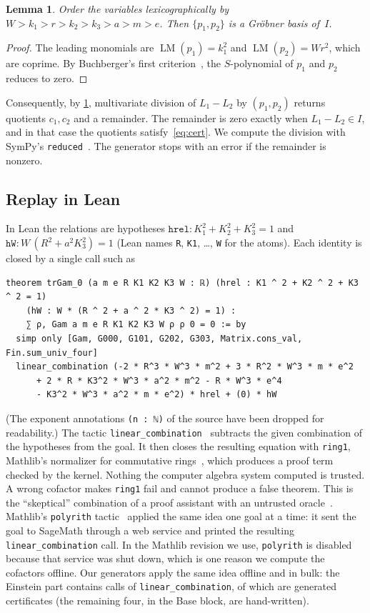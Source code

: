 \documentclass[11pt]{article}
\newtheorem{lemma}[theorem]{Lemma}
\theoremstyle{definition}
\theoremstyle{remark}
\newcommand{\lean}[1]{\lstinline[basicstyle=\ttfamily\normalsize,columns=fullflexible,breaklines=false]{#1}}
\newcommand{\LM}{\operatorname{LM}}
\begin{document}
\begin{lemma}\label{lem:gb}
Order the variables lexicographically by $W>k_1>r>k_2>k_3>a>m>e$.
Then $\{p_1,p_2\}$ is a Gr\"obner basis of~$I$.
\end{lemma}
\begin{proof}
The leading monomials are $\LM(p_1)=k_1^2$ and $\LM(p_2)=Wr^2$, which are coprime.
By Buchberger's first criterion~\cite{buchberger1965,buchberger1979,cox2015}, the $S$-polynomial of $p_1$ and $p_2$ reduces to zero.
\end{proof}

Consequently, by \cref{lem:gb}, multivariate division of $L_1-L_2$ by $(p_1,p_2)$ returns quotients $c_1,c_2$ and a remainder.
The remainder is zero exactly when $L_1-L_2\in I$, and in that case the quotients satisfy~\eqref{eq:cert}.
We compute the division with SymPy's \texttt{reduced}~\cite{meurer2017}.
The generator stops with an error if the remainder is nonzero.

\subsection{Replay in Lean}

In Lean the relations are hypotheses
$\mathtt{hrel}:K_1^2+K_2^2+K_3^2=1$ and $\mathtt{hW}:W\,(R^2+a^2K_3^2)=1$ (Lean names \lean{R}, \lean{K1}, \ldots, \lean{W} for the atoms).
Each identity is closed by a single call such as
\begin{lstlisting}
theorem trGam_0 (a m e R K1 K2 K3 W : ℝ) (hrel : K1 ^ 2 + K2 ^ 2 + K3 ^ 2 = 1)
    (hW : W * (R ^ 2 + a ^ 2 * K3 ^ 2) = 1) :
    ∑ ρ, Gam a m e R K1 K2 K3 W ρ ρ 0 = 0 := by
  simp only [Gam, G000, G101, G202, G303, Matrix.cons_val, Fin.sum_univ_four]
  linear_combination (-2 * R^3 * W^3 * m^2 + 3 * R^2 * W^3 * m * e^2
      + 2 * R * K3^2 * W^3 * a^2 * m^2 - R * W^3 * e^4
      - K3^2 * W^3 * a^2 * m * e^2) * hrel + (0) * hW
\end{lstlisting}
(The exponent annotations \lean{(n : ℕ)} of the source have been dropped for readability.)
The tactic \lean{linear_combination}~\cite{mathlib_linear_combination} subtracts the given combination of the hypotheses from the goal.
It then closes the resulting equation with \lean{ring1}, Mathlib's normalizer for commutative rings~\cite{mathlib_ring,gregoire2005}, which produces a proof term checked by the kernel.
Nothing the computer algebra system computed is trusted.
A wrong cofactor makes \lean{ring1} fail and cannot produce a false theorem.
This is the ``skeptical'' combination of a proof assistant with an untrusted oracle~\cite{harrison1998}.
Mathlib's \lean{polyrith} tactic~\cite{mathlib_polyrith} applied the same idea one goal at a time: it sent the goal to SageMath through a web service and printed the resulting \lean{linear_combination} call. In the Mathlib revision we use, \lean{polyrith} is disabled because that service was shut down, which is one reason we compute the cofactors offline.
Our generators apply the same idea offline and in bulk: the Einstein part contains \NumLCEinstein{} calls of \lean{linear_combination}, of which \NumCert{} are generated certificates (the remaining four, in the Base block, are hand-written).
\end{document}
